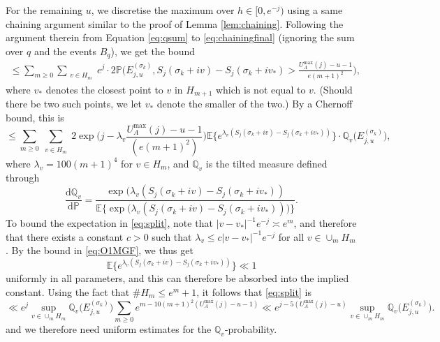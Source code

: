 \documentclass{amsart}
\theoremstyle{definition}
\theoremstyle{remark}
\numberwithin{equation}{section}
\begin{document}
For the remaining $u$, we discretise the maximum over $h\in[0,e^{-j})$ using a same chaining argument similar to the proof of Lemma \ref{lem:chaining}. Following the argument therein from Equation \eqref{eq:qsum} to \eqref{eq:chainingfinal} (ignoring the sum over $q$ and the events $B_q$), we get the bound
\begin{align}
    \leq \sum_{m\geq 0} \sum_{\substack{v\in H_m}} e^j\cdot2\mathbb{P}\Big(E_{j,u}^{(\sigma_k)}, S_{j}(\sigma_k+iv)-S_j(\sigma_k+iv_*)>\frac{U_A^{\max}(j)-u-1}{e(m+1)^2} \Big),\label{eq:discretisedtriple}
\end{align}
where $v_*$ denotes the closest point to $v$ in $H_{m+1}$ which is not equal to $v$. (Should there be two such points, we let $v_*$ denote the smaller of the two.)
By a Chernoff bound, this is
\begin{equation}\label{eq:split}
    \leq \sum_{m\geq 0} \sum_{\substack{v\in H_m}}2\exp\!\Big({j-\lambda_v \frac{U_A^{\text{max}}(j)-u-1}{(e(m+1)^2)}}\Big)\mathbb{E}\Big\{e^{\lambda_v(S_{j}(\sigma_k+iv)-S_j(\sigma_k+iv_*))}\Big\}\cdot\mathbb{Q}_{v}\big(E_{j,u}^{(\sigma_k)}\big),
\end{equation}
where $\lambda_v=100(m+1)^{4}$ for $v\in H_m$, and $\mathbb{Q}_{v}$ is the tilted measure defined through
\[
    \frac{\mathrm{d}\mathbb{Q}_{v}}{\mathrm{d}\mathbb{P}}=\frac{\exp\!{\big({\lambda_v(S_{j}(\sigma_k+iv)-S_j(\sigma_k+iv_*))}}}{\mathbb{E}\Big\{\!\exp\!\big({\lambda_v(S_{j}(\sigma_k+iv)-S_j (\sigma_k+iv_*))}\big)\Big\}}.
\]
To bound the expectation in \eqref{eq:split}, note that $|v-v_*|^{-1}e^{-j}\asymp e^m$, and therefore that there exists a constant $c>0$ such that $\lambda_v\leq c|v-v_*|^{-1}e^{-j}$ for all $v\in \cup_m H_m$.
By the bound in \eqref{eq:O1MGF}, we thus get
\[
\mathbb{E}\!\big\{e^{\lambda_v (S_j(\sigma_k+iv)-S_j(\sigma_k+iv_*))}\big\} \ll 1
\]
uniformly in all parameters, and this can therefore be absorbed into the implied constant. Using the fact that $\# H_m\leq e^{m}+1$, it follows that \eqref{eq:split} is 
\begin{equation}\label{eq:3.8ext}
    \ll e^{j} \sup_{v\in \cup_{m}H_m}\mathbb{Q}_{v}\big(E_{j,u}^{(\sigma_k)}\big)\sum_{m\geq 0} e^{m-10(m+1)^2(U_A^{\text{max}}(j)-u-1)} \ll e^{j-5(U_A^{\max}(j)-u)} \sup_{v\in \cup_{m}H_m}\mathbb{Q}_{v}\big(E_{j,u}^{(\sigma_k)}\big).
\end{equation}
and we therefore need {uniform} estimates for the $\mathbb{Q}_{v}$-probability.
\end{document}
